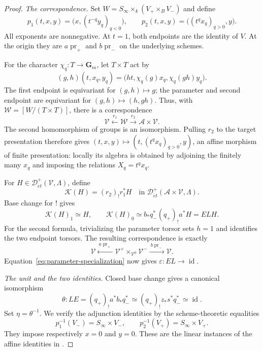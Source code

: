 \documentclass[11pt,a4paper]{article}
\newcommand{\Gm}{\mathbf G_m}
\newcommand{\pr}{\operatorname{pr}}
\newcommand{\Det}{\mathcal D_{\acute et}}
\newcommand{\cA}{\mathscr A}
\theoremstyle{notes}
\begin{document}
\begin{proof}
\emph{The correspondence.}
Set $W=S_\infty\times_k(V_+\times_B V_-)$ and define
\begin{equation}\label{eq:affine-endpoints}
p_1(t,x,y)=\bigl(x,(t^{-q}y_q)_{q<0}\bigr),\qquad
p_2(t,x,y)=\bigl((t^qx_q)_{q>0},y\bigr).
\end{equation}
All exponents are nonnegative. At $t=1$, both endpoints are the identity of $V$. At the origin they are $a\pr_+$ and $b\pr_-$ on the underlying schemes.

For the character $\chi_q:T\to\Gm$, let $T\times T$ act by
\[
(g,h)(t,x_q,y_q)=\bigl(ht,\chi_q(g)x_q,\chi_q(gh)y_q\bigr).
\]
The first endpoint is equivariant for $(g,h)\mapsto g$; the parameter and second endpoint are equivariant for $(g,h)\mapsto(h,gh)$. Thus, with $\mathscr W=[W/(T\times T)]$, there is a correspondence
\begin{equation}\label{eq:affine-correspondence}
\mathscr V\xleftarrow{\ r_1\ }\mathscr W
\xrightarrow{\ r_2\ }\cA\times\mathscr V.
\end{equation}
The second homomorphism of groups is an isomorphism. Pulling $r_2$ to the target presentation therefore gives $(t,x,y)\mapsto(t,(t^qx_q)_{q>0},y)$, an affine morphism of finite presentation: locally its algebra is obtained by adjoining the finitely many $x_q$ and imposing the relations $X_q=t^qx_q$.

For $H\in\Det^+(\mathscr V,\Lambda)$, define
\[
\mathcal K(H)=(r_2)_!r_1^*H
\quad\text{in }\Det^+(\cA\times\mathscr V,\Lambda).
\]
Base change for $!$ gives
\begin{equation}\label{eq:interpolation-fibers}
\mathcal K(H)_1\simeq H,\qquad
\mathcal K(H)_0\simeq b_*q_-^*(q_+)_!a^*H=ELH.
\end{equation}
For the second formula, trivializing the parameter torsor sets $h=1$ and identifies the two endpoint torsors. The resulting correspondence is exactly
\[
\mathscr V\xleftarrow{\ a\pr_+\ }
\mathscr V^+\times_{\mathscr V^0}\mathscr V^-
\xrightarrow{\ b\pr_-\ }\mathscr V.
\]
Equation~\eqref{eq:parameter-specialization} now gives $\varepsilon:EL\to\operatorname{id}$.

\emph{The unit and the two identities.}
Closed base change gives a canonical isomorphism
\begin{equation}\label{eq:intersection-unit}
\theta:LE=(q_+)_!a^*b_*q_-^*
\simeq(q_+)_!z_*s^*q_-^*\simeq\operatorname{id}.
\end{equation}
Set $\eta=\theta^{-1}$. We verify the adjunction identities by the scheme-theoretic equalities
\begin{equation}\label{eq:affine-fiber-products}
p_1^{-1}(V_-)=S_\infty\times V_-,
\qquad p_2^{-1}(V_+)=S_\infty\times V_+.
\end{equation}
They impose respectively $x=0$ and $y=0$. These are the linear instances of the affine identities in \cite[Proposition 2.6.3 and Remark 2.6.5]{DG}.


\end{proof}
\end{document}
